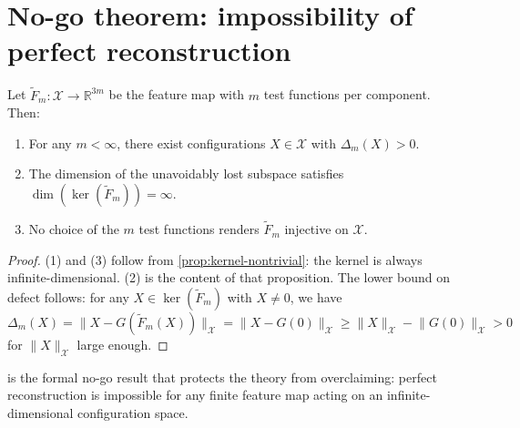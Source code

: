 \documentclass[12pt, oneside]{memoir}
\newcommand{\X}{\mathcal{X}}
\newcommand{\Ft}{\widetilde{F}}
\newcommand{\nnorm}[1]{\lVert #1 \rVert}
\begin{document}
\section{No-go theorem: impossibility of perfect reconstruction}

\begin{theorem}
\label{thm:no-go}
Let $\Ft_m: \X \to \mathbb{R}^{3m}$ be the feature map with $m$ test functions per
component.  Then:
\begin{enumerate}
  \item For any $m < \infty$, there exist configurations $X \in \X$ with $\Delta_m(X) > 0$.
  \item The dimension of the unavoidably lost subspace satisfies
        $\dim(\ker(\Ft_m)) = \infty$.
  \item No choice of the $m$ test functions renders $\Ft_m$ injective on $\X$.
\end{enumerate}
\end{theorem}

\begin{proof}
(1) and (3) follow from \cref{prop:kernel-nontrivial}: the kernel is always
infinite-dimensional.  (2) is the content of that proposition.  The lower bound on
defect follows: for any $X \in \ker(\Ft_m)$ with $X \ne 0$, we have $\Delta_m(X) =
\nnorm{X - G(\Ft_m(X))}_\X = \nnorm{X - G(0)}_\X \ge \nnorm{X}_\X - \nnorm{G(0)}_\X
> 0$ for $\nnorm{X}_\X$ large enough.
\end{proof}

 is the formal no-go result that protects the theory from overclaiming:
perfect reconstruction is impossible for any finite feature map acting on an
infinite-dimensional configuration space.
\end{document}
